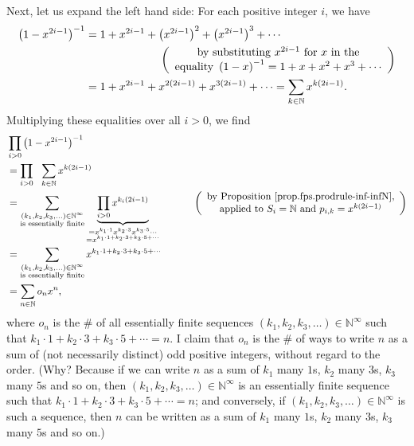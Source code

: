 Next, let us expand the left hand side: For each positive integer $i$, we have%
\begin{align*}
\left(  1-x^{2i-1}\right)  ^{-1}  &  =1+x^{2i-1}+\left(  x^{2i-1}\right)
^{2}+\left(  x^{2i-1}\right)  ^{3}+\cdots\\
&  \ \ \ \ \ \ \ \ \ \ \ \ \ \ \ \ \ \ \ \ \left(
\begin{array}
[c]{c}%
\text{by substituting }x^{2i-1}\text{ for }x\text{ in the}\\
\text{equality }\left(  1-x\right)  ^{-1}=1+x+x^{2}+x^{3}+\cdots
\end{array}
\right) \\
&  =1+x^{2i-1}+x^{2\left(  2i-1\right)  }+x^{3\left(  2i-1\right)  }%
+\cdots=\sum_{k\in\mathbb{N}}x^{k\left(  2i-1\right)  }.
\end{align*}
Multiplying these equalities over all $i>0$, we find%
\begin{align}
&  \prod_{i>0}\left(  1-x^{2i-1}\right)  ^{-1}\nonumber\\
&  =\prod_{i>0}\ \ \sum_{k\in\mathbb{N}}x^{k\left(  2i-1\right)  }\nonumber\\
&  =\sum_{\substack{\left(  k_{1},k_{2},k_{3},\ldots\right)  \in
\mathbb{N}^{\infty}\\\text{is essentially finite}}}\underbrace{\prod
_{i>0}x^{k_{i}\left(  2i-1\right)  }}_{\substack{=x^{k_{1}\cdot1}x^{k_{2}%
\cdot3}x^{k_{3}\cdot5}\cdots\\=x^{k_{1}\cdot1+k_{2}\cdot3+k_{3}\cdot5+\cdots}%
}}\ \ \ \ \ \ \ \ \ \ \left(
\begin{array}
[c]{c}%
\text{by Proposition \ref{prop.fps.prodrule-inf-infN},}\\
\text{applied to }S_{i}=\mathbb{N}\text{ and }p_{i,k}=x^{k\left(  2i-1\right)
}%
\end{array}
\right) \nonumber\\
&  =\sum_{\substack{\left(  k_{1},k_{2},k_{3},\ldots\right)  \in
\mathbb{N}^{\infty}\\\text{is essentially finite}}}x^{k_{1}\cdot1+k_{2}%
\cdot3+k_{3}\cdot5+\cdots}\nonumber\\
&  =\sum_{n\in\mathbb{N}}o_{n}x^{n}, \label{eq.prop.gf.prod.euler-odd.o}%
\end{align}
where $o_{n}$ is the \# of all essentially finite sequences $\left(
k_{1},k_{2},k_{3},\ldots\right)  \in\mathbb{N}^{\infty}$ such that $k_{1}%
\cdot1+k_{2}\cdot3+k_{3}\cdot5+\cdots=n$. I claim that $o_{n}$ is the \# of
ways to write $n$ as a sum of (not necessarily distinct) odd positive
integers, without regard to the order. (Why? Because if we can write $n$ as a
sum of $k_{1}$ many $1$s, $k_{2}$ many $3$s, $k_{3}$ many $5$s and so on, then
$\left(  k_{1},k_{2},k_{3},\ldots\right)  \in\mathbb{N}^{\infty}$ is an
essentially finite sequence such that $k_{1}\cdot1+k_{2}\cdot3+k_{3}%
\cdot5+\cdots=n$; and conversely, if $\left(  k_{1},k_{2},k_{3},\ldots\right)
\in\mathbb{N}^{\infty}$ is such a sequence, then $n$ can be written as a sum
of $k_{1}$ many $1$s, $k_{2}$ many $3$s, $k_{3}$ many $5$s and so on.)

